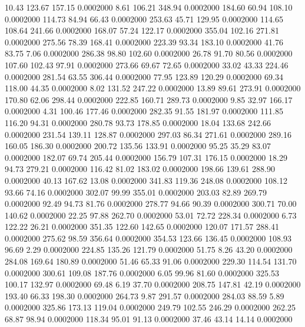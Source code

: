   10.43  123.67  157.15   0.0002000
   8.61  106.21  348.94   0.0002000
 184.60   60.94  108.10   0.0002000
 114.73   84.94   66.43   0.0002000
 253.63   45.71  129.95   0.0002000
 114.65  108.64  241.66   0.0002000
 168.07   57.24  122.17   0.0002000
 355.04  102.16  271.81   0.0002000
 275.56   78.39  168.41   0.0002000
 223.39   93.34  183.10   0.0002000
  41.76   83.75    7.06   0.0002000
 286.38   98.80  102.60   0.0002000
  26.78   91.70   80.56   0.0002000
 107.60  102.43   97.91   0.0002000
 273.66   69.67   72.65   0.0002000
  33.02   43.33  224.46   0.0002000
 281.54   63.55  306.44   0.0002000
  77.95  123.89  120.29   0.0002000
  69.34  118.00   44.35   0.0002000
   8.02  131.52  247.22   0.0002000
  13.89   89.61  273.91   0.0002000
 170.80   62.06  298.44   0.0002000
 222.85  160.71  289.73   0.0002000
   9.85   32.97  166.17   0.0002000
   4.31  100.46  177.46   0.0002000
 282.35   91.55  181.97   0.0002000
 111.85  116.20   94.31   0.0002000
 280.78   93.73  178.85   0.0002000
  18.04  133.68  242.66   0.0002000
 231.54  139.11  128.87   0.0002000
 297.03   86.34  271.61   0.0002000
 289.16  160.05  186.30   0.0002000
 200.72  135.56  133.91   0.0002000
  95.25   35.29   83.07   0.0002000
 182.07   69.74  205.44   0.0002000
 156.79  107.31  176.15   0.0002000
  18.29   94.73  279.21   0.0002000
 116.42   81.02  183.02   0.0002000
 198.66  139.61  288.90   0.0002000
  40.13  167.62   13.08   0.0002000
 341.83  119.36  248.08   0.0002000
 108.12   93.66   74.16   0.0002000
 302.07   99.99  355.01   0.0002000
 203.03   82.89  269.79   0.0002000
  92.49   94.73   81.76   0.0002000
 278.77   94.66   90.39   0.0002000
 300.71   70.00  140.62   0.0002000
  22.25   97.88  262.70   0.0002000
  53.01   72.72  228.34   0.0002000
   6.73  122.22   26.21   0.0002000
 351.35  122.60  142.65   0.0002000
 120.07  171.57  288.41   0.0002000
 275.62   98.59  356.64   0.0002000
 354.53  123.66  136.45   0.0002000
 108.93   96.69    2.29   0.0002000
 224.85  135.26  121.79   0.0002000
  51.75    8.26   43.20   0.0002000
 284.08  169.64  180.89   0.0002000
  51.46   65.33   91.06   0.0002000
 229.30  114.54  131.70   0.0002000
 300.61  109.08  187.76   0.0002000
   6.05   99.96   81.60   0.0002000
 325.53  100.17  132.97   0.0002000
  69.48    6.19   37.70   0.0002000
 208.75  147.81   42.19   0.0002000
 193.40   66.33  198.30   0.0002000
 264.73    9.87  291.57   0.0002000
 284.03   88.59    5.89   0.0002000
 325.86  173.13  119.04   0.0002000
 249.79  102.55  246.29   0.0002000
 262.25   68.87   98.94   0.0002000
 118.34   95.01   91.13   0.0002000
  37.46   43.14   14.14   0.0002000
